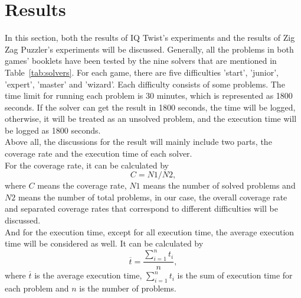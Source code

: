 \section{Results}
\label{sec:Result}
In this section, both the results of IQ Twist's experiments and the results of Zig Zag Puzzler's experiments will be discussed. Generally, all the problems in both games' booklets have been tested by the nine solvers that are mentioned in Table~\ref{tab:solvers}. For each game, there are five difficulties 'start', 'junior', 'expert', 'master' and 'wizard'. Each difficulty consists of some problems. The time limit for running each problem is 30 minutes, which is represented as 1800 seconds. If the solver can get the result in 1800 seconds, the time will be logged, otherwise, it will be treated as an unsolved problem, and the execution time will be logged as 1800 seconds. 
\\Above all, the discussions for the result will mainly include two parts, the coverage rate and the execution time of each solver. 
\\For the coverage rate, it can be calculated by 
\begin{equation}
\label{equation:coverage}
   C= N1/N2,
\end{equation}
where $C$ means the coverage rate, $N1$ means the number of solved problems and $N2$ means the number of total problems, in our case, the overall coverage rate and separated coverage rates that correspond to different difficulties will be discussed.
\\And for the execution time, except for all execution time, the average execution time will be considered as well. It can be calculated by 
\begin{equation}
\label{equation:averagetime}
\overline{t}=\frac{\sum\limits_{i=1}^n t_{i}}{n},
\end{equation}
where $\overline{t}$ is the average execution time, $\sum\limits_{i=1}^n t_{i}$ is the sum of execution time for each problem and $n$ is the number of problems.
